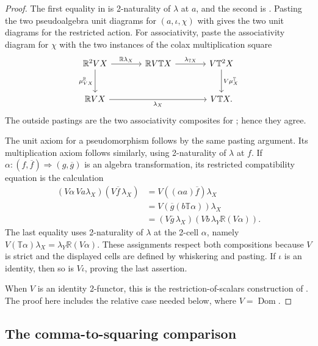 \documentclass[11pt]{article}
\theoremstyle{plain}
\theoremstyle{definition}
\theoremstyle{remark}
\newcommand{\Dom}{\operatorname{Dom}}
\numberwithin{equation}{section}
\begin{document}
\begin{proof}
The first equality in
 is 2-naturality of
$\lambda$ at $a$, and the second is
.  Pasting the two pseudoalgebra
unit diagrams for $(a,\iota,\chi)$ with
 gives the two unit diagrams for the
restricted action.  For associativity, paste the associativity diagram
for $\chi$ with the two instances of the colax multiplication square
\begin{equation*}
\begin{tikzcd}[column sep=large,row sep=large]
\mathbb R^2VX
  \arrow[r,"\mathbb R\lambda_X"]
  \arrow[d,"\mu^{\mathbb R}_{VX}"']
& \mathbb R V\mathbb TX
  \arrow[r,"\lambda_{\mathbb TX}"]
& V\mathbb T^2X
  \arrow[d,"V\mu^{\mathbb T}_X"] \\
\mathbb RVX \arrow[rr,"\lambda_X"']
&& V\mathbb TX .
\end{tikzcd}
\end{equation*}
The outside pastings are the two associativity composites for
; hence they agree.

The unit axiom for a pseudomorphism follows by the same pasting
argument.  Its multiplication axiom follows similarly, using
2-naturality of $\lambda$ at $f$.  If
$\alpha\colon(f,\overline f)\Rightarrow(g,\overline g)$ is an algebra
transformation, its restricted compatibility equation is the
calculation
\begin{align*}
  (V\alpha\,Va\lambda_X)(V\overline f\,\lambda_X)
  &=V((\alpha a)\overline f)\lambda_X\\
  &=V(\overline g(b\mathbb T\alpha))\lambda_X\\
  &=(V\overline g\,\lambda_X)
    (Vb\,\lambda_Y\mathbb R(V\alpha)).
\end{align*}
The last equality uses 2-naturality of $\lambda$ at the 2-cell
$\alpha$, namely
$V(\mathbb T\alpha)\lambda_X=\lambda_Y\mathbb R(V\alpha)$.
These assignments respect
both compositions because $V$ is strict and the displayed cells are
defined by whiskering and pasting.  If $\iota$ is an identity, then so
is $V\iota$, proving the last assertion.

When $V$ is an identity 2-functor, this is the restriction-of-scalars
construction of \citet[Theorem~A.7]{PerroneTholen2022}.  The proof here
includes the relative case needed below, where $V=\Dom$.
\end{proof}

\subsection{The comma-to-squaring comparison}
\end{document}
